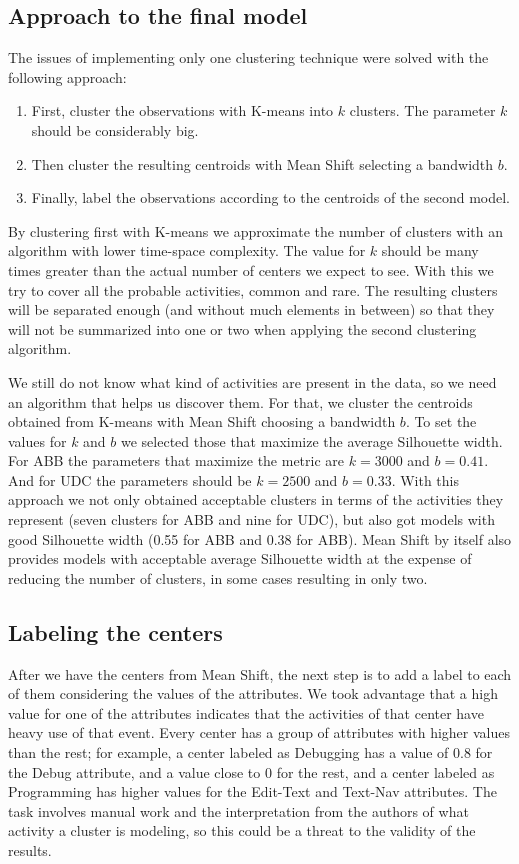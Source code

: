 \subsection{Approach to the final model}
The issues of implementing only one clustering technique were solved with the following approach:

\begin{enumerate}
	\item First, cluster the observations with K-means into $k$ clusters. The parameter $k$ should be considerably big.
	\item Then cluster the resulting centroids with Mean Shift selecting a bandwidth $b$.
	\item Finally, label the observations according to the centroids of the second model.
\end{enumerate}

By clustering first with K-means we approximate the number of clusters with an algorithm with lower time-space complexity. The value for $k$ should be many times greater than the actual number of centers we expect to see. With this we try to cover all the probable activities, common and rare. The resulting clusters will be separated enough (and without much elements in between) so that they will not be summarized into one or two when applying the second clustering algorithm.

We still do not know what kind of activities are present in the data, so we need an algorithm that helps us discover them. For that, we cluster the centroids obtained from K-means with Mean Shift choosing a bandwidth $b$. To set the values for $k$ and $b$ we selected those that maximize the average Silhouette width. For ABB the parameters that maximize the metric are $k=3000$ and $b=0.41$. And for UDC the parameters should be $k=2500$ and $b=0.33$. With this approach we not only obtained acceptable clusters in terms of the activities they represent (seven clusters for ABB and nine for UDC), but also got models with good Silhouette width (0.55 for ABB and 0.38 for ABB). Mean Shift by itself also provides models with acceptable average Silhouette width at the expense of reducing the number of clusters, in some cases resulting in only two.

\subsection{Labeling the centers}
After we have the centers from Mean Shift, the next step is to add a label to each of them considering the values of the attributes. We took advantage that a high value for one of the attributes indicates that the activities of that center have heavy use of that event. Every center has a group of attributes with higher values than the rest; for example, a center labeled as Debugging has a value of 0.8 for the Debug attribute, and a value close to 0 for the rest, and a center labeled as Programming has higher values for the Edit-Text and Text-Nav attributes. The task involves manual work and the interpretation from the authors of what activity a cluster is modeling, so this could be a threat to the validity of the results. 

